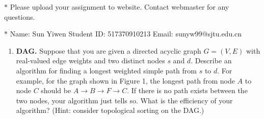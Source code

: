\documentclass[12pt,a4paper]{article}
\theoremstyle{definition}
\begin{document}
\noindent

\noindent{}
\begin{center}
\footnotesize{\color{red}$*$ Please upload your assignment to website. Contact webmaster for any questions.}

\footnotesize{\color{blue}$*$ Name: Sun Yiwen  \quad Student ID: 517370910213 \quad Email: sunyw99@sjtu.edu.cn}
\end{center}


\begin{enumerate}

\item \textbf{DAG.} Suppose that you are given a directed acyclic graph $G=(V,E)$ with real-valued edge weights and two distinct nodes $s$ and $d$. Describe an algorithm for finding a longest weighted simple path from $s$ to $d$. For example, for the graph shown in Figure 1, the longest path from node $A$ to node $C$ should be $A \rightarrow B \rightarrow F \rightarrow C$. If there is no path exists between the two nodes, your algorithm just tells so. What is the efficiency of your algorithm? (Hint: consider topological sorting on the DAG.)


\end{enumerate}
\end{document}
